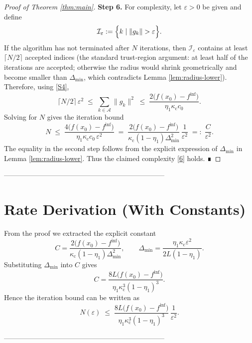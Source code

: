 \documentclass{article}
\begin{document}
\begin{proof}[Proof of Theorem \ref{thm:main}]
\textbf{Step 6.}  For complexity, let \(\varepsilon>0\) be given and define
\[
\mathcal{I}_{\varepsilon}:=
\Bigl\{k\mid\|g_{k}\|>\varepsilon\Bigr\}.
\]
If the algorithm has not terminated after \(N\) iterations,
then \(\mathcal{I}_{\varepsilon}\) contains at least
\(\lceil N/2\rceil\) accepted indices (the standard
trust‑region argument: at least half of the iterations are accepted;
otherwise the radius would shrink geometrically and become smaller than
\(\Delta_{\min}\), which contradicts Lemma \ref{lem:radius-lower}).
Therefore, using \eqref{S4},
\[
\lceil N/2\rceil\,\varepsilon^{2}
\;\le\;
\sum_{k\in\mathcal{A}}\|g_{k}\|^{2}
\;\le\;
\frac{2\bigl(f(x_{0})-f^{\inf}\bigr)}
{\eta_{1}\kappa_{\mathrm{c}}c_{0}} .
\]
Solving for \(N\) gives the iteration bound
\[
N\;\le\;
\frac{4\bigl(f(x_{0})-f^{\inf}\bigr)}
{\eta_{1}\kappa_{\mathrm{c}}c_{0}\,\varepsilon^{2}}
\;=\;
\frac{2\bigl(f(x_{0})-f^{\inf}\bigr)}
{\kappa_{\mathrm{c}}(1-\eta_{1})\Delta_{\min}^{2}}\,
\frac{1}{\varepsilon^{2}}
\;=:\;\frac{C}{\varepsilon^{2}} .
\tag{S5}
\]
The equality in the second step follows from the explicit expression of
\(\Delta_{\min}\) in Lemma \ref{lem:radius-lower}.
Thus the claimed complexity \eqref{6} holds. ∎
\end{proof}

---------------------------------------------------------------------

\section*{Rate Derivation (With Constants)}
From the proof we extracted the explicit constant
\[
C
=
\frac{2\bigl(f(x_{0})-f^{\inf}\bigr)}
{\kappa_{\mathrm{c}}(1-\eta_{1})\Delta_{\min}^{2}},
\qquad
\Delta_{\min}
=
\frac{\eta_{1}\kappa_{\mathrm{c}}\varepsilon^{2}}
{2L(1-\eta_{1})}.
\]
Substituting \(\Delta_{\min}\) into \(C\) gives
\[
C
=
\frac{8L\bigl(f(x_{0})-f^{\inf}\bigr)}
{\eta_{1}\kappa_{\mathrm{c}}^{3}(1-\eta_{1})^{3}}.
\]
Hence the iteration bound can be written as
\[
N(\varepsilon)\;\le\;
\frac{8L\bigl(f(x_{0})-f^{\inf}\bigr)}
{\eta_{1}\kappa_{\mathrm{c}}^{3}(1-\eta_{1})^{3}}\,
\frac{1}{\varepsilon^{2}}.
\]

---------------------------------------------------------------------
\end{document}
